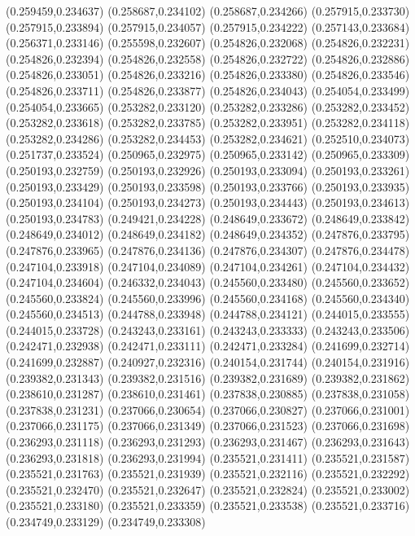 (0.259459,0.234637)
(0.258687,0.234102)
(0.258687,0.234266)
(0.257915,0.233730)
(0.257915,0.233894)
(0.257915,0.234057)
(0.257915,0.234222)
(0.257143,0.233684)
(0.256371,0.233146)
(0.255598,0.232607)
(0.254826,0.232068)
(0.254826,0.232231)
(0.254826,0.232394)
(0.254826,0.232558)
(0.254826,0.232722)
(0.254826,0.232886)
(0.254826,0.233051)
(0.254826,0.233216)
(0.254826,0.233380)
(0.254826,0.233546)
(0.254826,0.233711)
(0.254826,0.233877)
(0.254826,0.234043)
(0.254054,0.233499)
(0.254054,0.233665)
(0.253282,0.233120)
(0.253282,0.233286)
(0.253282,0.233452)
(0.253282,0.233618)
(0.253282,0.233785)
(0.253282,0.233951)
(0.253282,0.234118)
(0.253282,0.234286)
(0.253282,0.234453)
(0.253282,0.234621)
(0.252510,0.234073)
(0.251737,0.233524)
(0.250965,0.232975)
(0.250965,0.233142)
(0.250965,0.233309)
(0.250193,0.232759)
(0.250193,0.232926)
(0.250193,0.233094)
(0.250193,0.233261)
(0.250193,0.233429)
(0.250193,0.233598)
(0.250193,0.233766)
(0.250193,0.233935)
(0.250193,0.234104)
(0.250193,0.234273)
(0.250193,0.234443)
(0.250193,0.234613)
(0.250193,0.234783)
(0.249421,0.234228)
(0.248649,0.233672)
(0.248649,0.233842)
(0.248649,0.234012)
(0.248649,0.234182)
(0.248649,0.234352)
(0.247876,0.233795)
(0.247876,0.233965)
(0.247876,0.234136)
(0.247876,0.234307)
(0.247876,0.234478)
(0.247104,0.233918)
(0.247104,0.234089)
(0.247104,0.234261)
(0.247104,0.234432)
(0.247104,0.234604)
(0.246332,0.234043)
(0.245560,0.233480)
(0.245560,0.233652)
(0.245560,0.233824)
(0.245560,0.233996)
(0.245560,0.234168)
(0.245560,0.234340)
(0.245560,0.234513)
(0.244788,0.233948)
(0.244788,0.234121)
(0.244015,0.233555)
(0.244015,0.233728)
(0.243243,0.233161)
(0.243243,0.233333)
(0.243243,0.233506)
(0.242471,0.232938)
(0.242471,0.233111)
(0.242471,0.233284)
(0.241699,0.232714)
(0.241699,0.232887)
(0.240927,0.232316)
(0.240154,0.231744)
(0.240154,0.231916)
(0.239382,0.231343)
(0.239382,0.231516)
(0.239382,0.231689)
(0.239382,0.231862)
(0.238610,0.231287)
(0.238610,0.231461)
(0.237838,0.230885)
(0.237838,0.231058)
(0.237838,0.231231)
(0.237066,0.230654)
(0.237066,0.230827)
(0.237066,0.231001)
(0.237066,0.231175)
(0.237066,0.231349)
(0.237066,0.231523)
(0.237066,0.231698)
(0.236293,0.231118)
(0.236293,0.231293)
(0.236293,0.231467)
(0.236293,0.231643)
(0.236293,0.231818)
(0.236293,0.231994)
(0.235521,0.231411)
(0.235521,0.231587)
(0.235521,0.231763)
(0.235521,0.231939)
(0.235521,0.232116)
(0.235521,0.232292)
(0.235521,0.232470)
(0.235521,0.232647)
(0.235521,0.232824)
(0.235521,0.233002)
(0.235521,0.233180)
(0.235521,0.233359)
(0.235521,0.233538)
(0.235521,0.233716)
(0.234749,0.233129)
(0.234749,0.233308)
